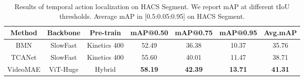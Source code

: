 \begin{table}[t]
\centering
\caption{ Results of temporal action localization on HACS Segment. We report mAP at different tIoU thresholds. Average mAP in [0.5:0.05:0.95] on HACS Segment.}
\begin{tabular}{c|c|c|cccc }
\hline
 \textbf{Method} &\textbf{Backbone} &\textbf{Pre-train} &\textbf{mAP@0.50}& \textbf{mAP@0.75}& \textbf{mAP@0.95} & \textbf{Avg.mAP} \\
\hline 
BMN \cite{lin2019bmn} & SlowFast & Kinetics 400  & 52.49 &36.38 & 10.37 & 35.76\\
TCANet \cite{qing2021temporal} & SlowFast & Kinetics 400  & 55.60& 40.01& 11.47& 38.71 \\
VideoMAE&ViT-Huge & Hybrid & \textbf{58.19} & \textbf{42.39} & \textbf{13.71} & \textbf{41.31}  \\
\hline
\end{tabular}
\label{tab:SOAT_hacs}
\vspace{-2mm}
\end{table}
